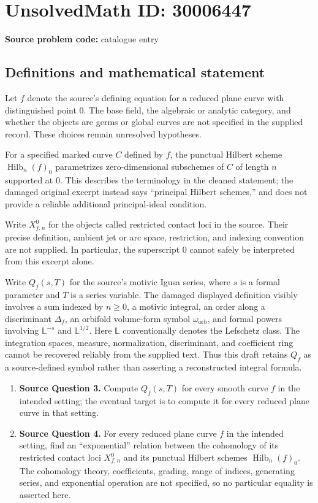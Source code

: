 \documentclass[11pt]{article}
\begin{document}
\section*{UnsolvedMath ID: 30006447}
\textbf{Source problem code:} catalogue entry
\subsection{Definitions and mathematical statement}
Let \(f\) denote the source's defining equation for a reduced plane curve with distinguished point \(0\). The base field, the algebraic or analytic category, and whether the objects are germs or global curves are not specified in the supplied record. These choices remain unresolved hypotheses.

For a specified marked curve \(C\) defined by \(f\), the punctual Hilbert scheme \(\operatorname{Hilb}_n(f)_0\) parametrizes zero-dimensional subschemes of \(C\) of length \(n\) supported at \(0\). This describes the terminology in the cleaned statement; the damaged original excerpt instead says ``principal Hilbert schemes,'' and does not provide a reliable additional principal-ideal condition.

Write \(X_{f,n}^0\) for the objects called restricted contact loci in the source. Their precise definition, ambient jet or arc space, restriction, and indexing convention are not supplied. In particular, the superscript \(0\) cannot safely be interpreted from this excerpt alone.

Write \(Q_f(s,T)\) for the source's motivic Igusa series, where \(s\) is a formal parameter and \(T\) is a series variable. The damaged displayed definition visibly involves a sum indexed by \(n\geq 0\), a motivic integral, an order along a discriminant \(\Delta_f\), an orbifold volume-form symbol \(\omega_{\mathrm{orb}}\), and formal powers involving \(\mathbb L^{-s}\) and \(\mathbb L^{1/2}\). Here \(\mathbb L\) conventionally denotes the Lefschetz class. The integration spaces, measure, normalization, discriminant, and coefficient ring cannot be recovered reliably from the supplied text. Thus this draft retains \(Q_f\) as a source-defined symbol rather than asserting a reconstructed integral formula.

\begin{enumerate}
\item \textbf{Source Question 3.} Compute \(Q_f(s,T)\) for every smooth curve \(f\) in the intended setting; the eventual target is to compute it for every reduced plane curve in that setting.
\item \textbf{Source Question 4.} For every reduced plane curve \(f\) in the intended setting, find an ``exponential'' relation between the cohomology of its restricted contact loci \(X_{f,n}^0\) and its punctual Hilbert schemes \(\operatorname{Hilb}_n(f)_0\). The cohomology theory, coefficients, grading, range of indices, generating series, and exponential operation are not specified, so no particular equality is asserted here.
\end{enumerate}
\end{document}
